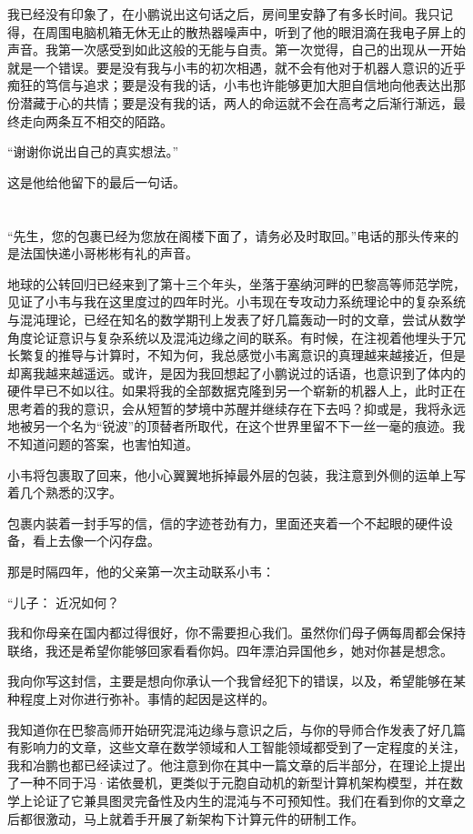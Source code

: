 \documentclass[punct=kaiming, zihao=5, openany, fontset=sikou]{ctexbook}
\begin{document}
我已经没有印象了，在小鹏说出这句话之后，房间里安静了有多长时间。我只记得，在周围电脑机箱无休无止的散热器噪声中，听到了他的眼泪滴在我电子屏上的声音。我第一次感受到如此这般的无能与自责。第一次觉得，自己的出现从一开始就是一个错误。要是没有我与小韦的初次相遇，就不会有他对于机器人意识的近乎痴狂的笃信与追求；要是没有我的话，小韦也许能够更加大胆自信地向他表达出那份潜藏于心的共情；要是没有我的话，两人的命运就不会在高考之后渐行渐远，最终走向两条互不相交的陌路。

“谢谢你说出自己的真实想法。”

这是他给他留下的最后一句话。

\section{}

“先生，您的包裹已经为您放在阁楼下面了，请务必及时取回。”电话的那头传来的是法国快递小哥彬彬有礼的声音。

地球的公转回归已经来到了第十三个年头，坐落于塞纳河畔的巴黎高等师范学院，见证了小韦与我在这里度过的四年时光。小韦现在专攻动力系统理论中的复杂系统与混沌理论，已经在知名的数学期刊上发表了好几篇轰动一时的文章，尝试从数学角度论证意识与复杂系统以及混沌边缘之间的联系。有时候，在注视着他埋头于冗长繁复的推导与计算时，不知为何，我总感觉小韦离意识的真理越来越接近，但是却离我越来越遥远。或许，是因为我回想起了小鹏说过的话语，也意识到了体内的硬件早已不如以往。如果将我的全部数据克隆到另一个崭新的机器人上，此时正在思考着的我的意识，会从短暂的梦境中苏醒并继续存在下去吗？抑或是，我将永远地被另一个名为“锐波”的顶替者所取代，在这个世界里留不下一丝一毫的痕迹。我不知道问题的答案，也害怕知道。

小韦将包裹取了回来，他小心翼翼地拆掉最外层的包装，我注意到外侧的运单上写着几个熟悉的汉字。

包裹内装着一封手写的信，信的字迹苍劲有力，里面还夹着一个不起眼的硬件设备，看上去像一个闪存盘。

那是时隔四年，他的父亲第一次主动联系小韦：

“儿子： 近况如何？

我和你母亲在国内都过得很好，你不需要担心我们。虽然你们母子俩每周都会保持联络，我还是希望你能够回家看看你妈。四年漂泊异国他乡，她对你甚是想念。

我向你写这封信，主要是想向你承认一个我曾经犯下的错误，以及，希望能够在某种程度上对你进行弥补。事情的起因是这样的。

我知道你在巴黎高师开始研究混沌边缘与意识之后，与你的导师合作发表了好几篇有影响力的文章，这些文章在数学领域和人工智能领域都受到了一定程度的关注，我和冶鹏也都已经读过了。他注意到你在其中一篇文章的后半部分，在理论上提出了一种不同于冯·诺依曼机，更类似于元胞自动机的新型计算机架构模型，并在数学上论证了它兼具图灵完备性及内生的混沌与不可预知性。我们在看到你的文章之后都很激动，马上就着手开展了新架构下计算元件的研制工作。
\end{document}
